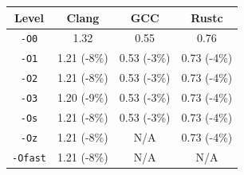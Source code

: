 \begin{tabular*}{\columnwidth}{@{\extracolsep\fill}cccc@{\extracolsep\fill}}
\toprule
\textbf{Level} & \textbf{Clang} & \textbf{GCC} & \textbf{Rustc} \\
\midrule
\texttt{-O0} & 1.32 & 0.55 & 0.76 \\
\texttt{-O1} & 1.21 (-8\%) & 0.53 (-3\%) & 0.73 (-4\%) \\
\texttt{-O2} & 1.21 (-8\%) & 0.53 (-3\%) & 0.73 (-4\%) \\
\texttt{-O3} & 1.20 (-9\%) & 0.53 (-3\%) & 0.73 (-4\%) \\
\texttt{-Os} & 1.21 (-8\%) & 0.53 (-3\%) & 0.73 (-4\%) \\
\texttt{-Oz} & 1.21 (-8\%) & N/A & 0.73 (-4\%) \\
\texttt{-Ofast} & 1.21 (-8\%) & N/A & N/A \\
\bottomrule
\end{tabular*}
